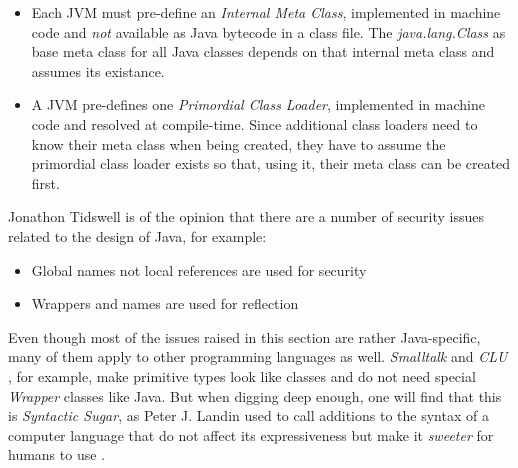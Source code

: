 \begin{itemize}
    \item[-] Each JVM must pre-define an \emph{Internal Meta Class}, implemented
        in machine code and \emph{not} available as Java bytecode in a class file.
        The \emph{java.lang.Class} as base meta class for all Java classes depends
        on that internal meta class and assumes its existance.
    \item[-] A JVM pre-defines one \emph{Primordial Class Loader}, implemented in
        machine code and resolved at compile-time. Since additional class loaders
        need to know their meta class when being created, they have to assume the
        primordial class loader exists so that, using it, their meta class can be
        created first.
\end{itemize}

Jonathon Tidswell \cite{josgeneral} is of the opinion that there are a number of
security issues related to the design of Java, for example:

\begin{itemize}
    \item[-] Global names not local references are used for security
    \item[-] Wrappers and names are used for reflection
\end{itemize}

Even though most of the issues raised in this section are rather Java-specific,
many of them apply to other programming languages as well. \emph{Smalltalk}
\cite{smalltalk} and \emph{CLU} \cite{clu}, for example, make primitive types
look like classes and do not need special \emph{Wrapper} classes like Java. But
when digging deep enough, one will find that this is \emph{Syntactic Sugar}, as
Peter J. Landin used to call additions to the syntax of a computer language
that do not affect its expressiveness but make it \emph{sweeter} for humans to
use \cite{wikipedia}.
